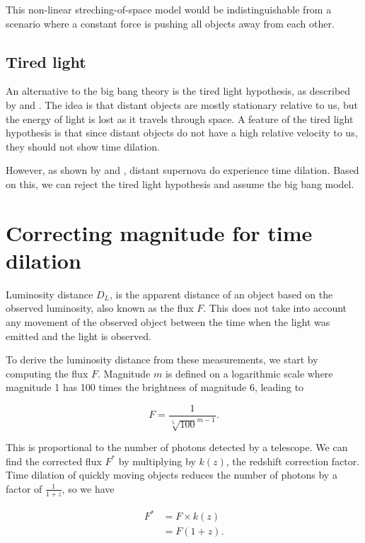 \documentclass{article}
\begin{document}
This non-linear streching-of-space model would be indistinguishable from a
scenario where a constant force is pushing all objects away from each other.

\subsection{Tired light}

An alternative to the big bang theory is the tired light hypothesis, as
described by \citet{zwicky1929} and \citet{shao2013}. The idea is that distant
objects are mostly stationary relative to us, but the energy of light is lost
as it travels through space. A feature of the tired light hypothesis is that
since distant objects do not have a high relative velocity to us, they should
not show time dilation.

However, as shown by \citet{blondin2008} and \citet{white2024}, distant
supernova do experience time dilation. Based on this, we can reject the tired
light hypothesis and assume the big bang model.

\section{Correcting magnitude for time dilation}
\label{sec:correction}

Luminosity distance $D_L$, is the apparent distance of an object based on the
observed luminosity, also known as the flux $F$. This does not take into
account any movement of the observed object between the time when the light was
emitted and the light is observed.

To derive the luminosity distance from these measurements, we start
by computing the flux $F$. Magnitude $m$ is defined on a logarithmic scale
where magnitude 1 has 100 times the brightness of magnitude 6, leading to

\begin{equation}
  F = \frac{1}{\sqrt[5]{100}^{m - 1}}.
\end{equation}

This is proportional to the number of photons detected by a telescope. We can
find the corrected flux $F^*$ by multiplying by $k(z)$, the redshift correction
factor. Time dilation of quickly moving objects reduces the number of photons
by a factor of $\frac{1}{1 + z}$, so we have

\begin{equation}
\begin{aligned}
  F^* &= F \times k(z) \\
      &= F (1 + z).
\end{aligned}
\end{equation}
\end{document}
